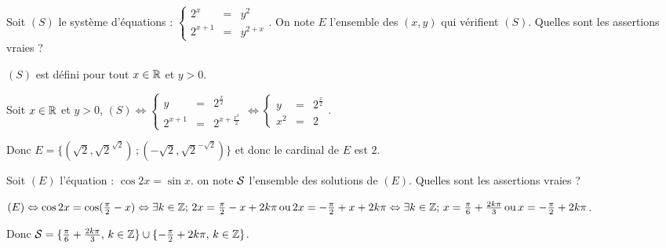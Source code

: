 \begin{question} 
Soit $(S)$ le système d'équations : $\left\{\begin{array}{ccl}2^x&=&y^2\\2^{x+1}&=&y^{2+x} \end{array}\right.$.  On note $E$ l'ensemble des $(x,y)$ qui vérifient $(S)$. Quelles sont les assertions vraies ?

\begin{answers}


    
\end{answers}
\begin{explanations}
$(S)$ est défini pour tout $x\in \mathbb{R}$ et $y>0$.

Soit $x\in \mathbb{R}$ et $y>0$, $(S) \Leftrightarrow \left\{\begin{array}{ccl}y&=&2^{\frac{x}{2}} \\2^{x+1}&=&2^{x+\frac{x^2}{2}} \end{array}\right.  \Leftrightarrow \left\{\begin{array}{ccl}y&=&2^{\frac{x}{2}} \\x^2&=&2 \end{array}\right. $. 

Donc $E = \{ (\sqrt 2, \sqrt 2^{\sqrt 2})\,  ; (-\sqrt 2, \sqrt 2^{-\sqrt 2})\}$ et donc le cardinal de $E$ est $2$.
\end{explanations}


\end{question}




\begin{question} 
Soit $(E)$ l'équation : $ \cos 2x = \sin x $. on note $\cal{S}$ l'ensemble des solutions de $(E)$. Quelles sont les assertions vraies ?

\begin{answers}



\end{answers}
\begin{explanations}
$(E) \Leftrightarrow  \cos 2x =  \cos ( \frac{\pi}{2} -x) \Leftrightarrow      \exists k\in \mathbb{Z}; \,  2x =  \frac{\pi}{2} -x +2k\pi \, \mbox {ou} \, 2x =  -\frac{\pi}{2} +x +2k\pi  \Leftrightarrow      \exists k\in \mathbb{Z};\,  x =  \frac{\pi}{6}  +\frac{ 2k\pi}{3} \, \mbox {ou} \, x =  -\frac{\pi}{2} +2k\pi$. 

Donc ${\cal{S}} = \{\frac{\pi}{6}  +\frac{ 2k\pi}{3}, \, k\in \mathbb{Z} \} \cup \{ -\frac{\pi}{2} +2k\pi, \,  k\in \mathbb{Z} \} $.

\end{explanations}


\end{question}

